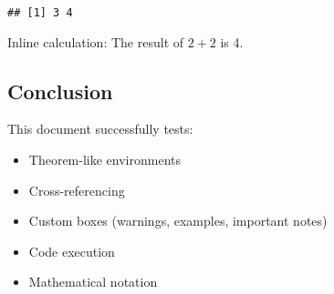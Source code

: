 \documentclass[
]{article}
\providecommand{\tightlist}{%
  \setlength{\itemsep}{0pt}\setlength{\parskip}{0pt}}
\begin{document}
\begin{verbatim}
## [1] 3 4
\end{verbatim}

Inline calculation: The result of \(2+2\) is 4.

\subsection{Conclusion}\label{conclusion}

This document successfully tests:

\begin{itemize}
\tightlist
\item
  Theorem-like environments
\item
  Cross-referencing
\item
  Custom boxes (warnings, examples, important notes)
\item
  Code execution
\item
  Mathematical notation
\end{itemize}
\end{document}
